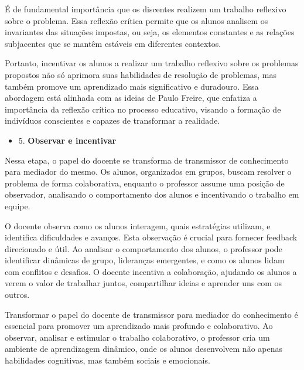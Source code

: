 É de fundamental importância que os discentes realizem um trabalho reflexivo sobre o problema. Essa reflexão crítica permite que os alunos analisem os invariantes das situações impostas, ou seja, os elementos constantes e as relações subjacentes que se mantêm estáveis em diferentes contextos.

Portanto, incentivar os alunos a realizar um trabalho reflexivo sobre os problemas propostos não só aprimora suas habilidades de resolução de problemas, mas também promove um aprendizado mais significativo e duradouro. Essa abordagem está alinhada com as ideias de Paulo Freire, que enfatiza a importância da reflexão crítica no processo educativo, visando a formação de indivíduos conscientes e capazes de transformar a realidade.


\begin{itemize}
    \item 5. \textbf{Observar e incentivar}
\end{itemize}

Nessa etapa, o papel do docente se transforma de transmissor de conhecimento para mediador do mesmo. Os alunos, organizados em grupos, buscam resolver o problema de forma colaborativa, enquanto o professor assume uma posição de observador, analisando o comportamento dos alunos e incentivando o trabalho em equipe.

O docente observa como os alunos interagem, quais estratégias utilizam, e identifica dificuldades e avanços. Esta observação é crucial para fornecer feedback direcionado e útil. Ao analisar o comportamento dos alunos, o professor pode identificar dinâmicas de grupo, lideranças emergentes, e como os alunos lidam com conflitos e desafios. O docente incentiva a colaboração, ajudando os alunos a verem o valor de trabalhar juntos, compartilhar ideias e aprender uns com os outros.

Transformar o papel do docente de transmissor para mediador do conhecimento é essencial para promover um aprendizado mais profundo e colaborativo. Ao observar, analisar e estimular o trabalho colaborativo, o professor cria um ambiente de aprendizagem dinâmico, onde os alunos desenvolvem não apenas habilidades cognitivas, mas também sociais e emocionais.


